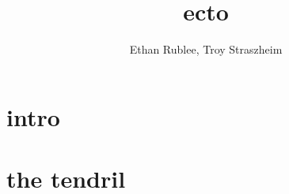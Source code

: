 \documentclass[10pt,a4paper]{article}
\author{Ethan Rublee, Troy Straszheim}
\title{ecto}
\begin{document}
\section{intro}
\section{the tendril}
\end{document}
